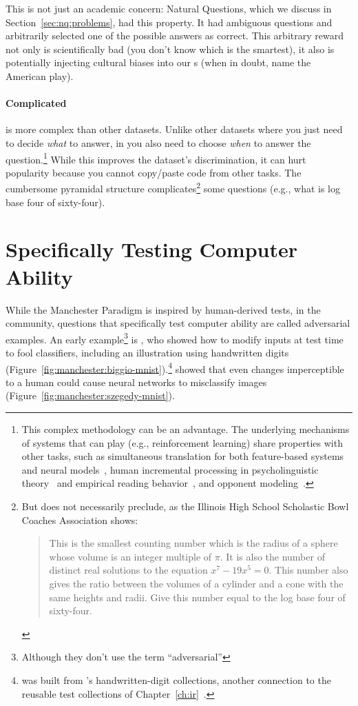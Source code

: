 This is not just an academic concern: Natural Questions, which we
discuss in Section~\ref{sec:nq:problems}, had this property.
%
It had ambiguous questions and arbitrarily selected one of the
possible answers as correct.
%
This arbitrary reward not only is scientifically bad (you don't know
which  is the smartest), it also is potentially injecting
cultural biases into our s (when in doubt, name the American
play).


\paragraph{Complicated}

\qb{} is more complex than other datasets. Unlike other datasets where you just
need to decide \emph{what} to answer, in \qb{} you also need to choose
\emph{when} to answer the question.\footnote{This complex methodology can be an
  advantage. The underlying mechanisms of systems that can play \qb{} (e.g.,
  reinforcement learning) share properties with other tasks, such as
  simultaneous translation for both feature-based systems~\citep{grissom:he:boyd-graber:morgan-2014}
  and neural models~\citep{ma-etal-2019-stacl},
  human incremental processing in psycholinguistic theory~\citep{levy-08}
  and empirical reading behavior~\citep{levy-11}, and opponent
  modeling~\citep{he-16}.}
While this improves the dataset's discrimination, it can hurt popularity
because you cannot copy/paste code from other  tasks. The cumbersome
pyramidal structure complicates\footnote{But does not necessarily preclude, as
  the Illinois High School Scholastic Bowl Coaches Association shows:
\begin{quote}
    This is the smallest counting number which is the radius of a sphere whose volume is an integer multiple of $\pi$. It is also the number of distinct real solutions to the equation $x^7-19x^5=0$. This number also gives the ratio between the volumes of a cylinder and a cone with the same heights and radii. Give this number equal to the log base four of sixty-four.
\end{quote}} some questions (e.g., what is log base four of sixty-four).


\section{Specifically Testing Computer Ability}

While the Manchester Paradigm is inspired by human-derived tests,
in the  community, questions that specifically test computer
ability are called adversarial examples.
%
An early example\footnote{Although they don't use the term
``adversarial''} is \citet{biggio-13}, who showed how to modify inputs
at test time to fool classifiers, including an illustration using
 handwritten digits
(Figure~\ref{fig:manchester:biggio-mnist}).\footnote{ was built from
  's handwritten-digit collections, another connection to the
  reusable test collections of Chapter~\ref{ch:ir}~\citep{lecun-98}.}
\citet{szegedy-14} showed that even changes imperceptible to a human
could cause neural networks to misclassify images
(Figure~\ref{fig:manchester:szegedy-mnist}).

